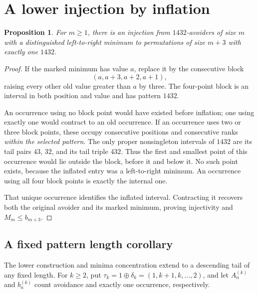 \documentclass[11pt]{article}
\newtheorem{proposition}[theorem]{Proposition}
\theoremstyle{remark}\newtheorem{remark}[theorem]{Remark}
\begin{document}
\section{A lower injection by inflation}\label{u1432:sec:lower}
\begin{proposition}\label{u1432:prop:lower}
For $m\ge1$, there is an injection from $1432$-avoiders of size $m$ with
a distinguished left-to-right minimum to permutations of size $m+3$
with exactly one $1432$.
\end{proposition}
\begin{proof}
If the marked minimum has value $a$, replace it by the consecutive block
\[
 (a,a+3,a+2,a+1),
\]
raising every other old value greater than $a$ by three. The four-point
block is an interval in both position and value and has pattern $1432$.

An occurrence using no block point would have existed before inflation;
one using exactly one would contract to an old occurrence. If an occurrence
uses two or three block points, these occupy consecutive positions and
consecutive ranks \emph{within the selected pattern}. The only proper
nonsingleton intervals of $1432$ are its tail pairs $43$, $32$, and its
tail triple $432$. Thus the first and smallest point of this occurrence
would lie outside the block, before it and below it. No such point exists,
because the inflated entry was a left-to-right minimum. An occurrence
using all four block points is exactly the internal one.

That unique occurrence identifies the inflated interval. Contracting it
recovers both the original avoider and its marked minimum, proving
injectivity and $M_m\le b_{m+3}$.
\end{proof}

\subsection{A fixed pattern length corollary}
The lower construction and minima concentration extend to a descending
tail of any fixed length. For $k\ge2$, put
$\tau_k=1\oplus\delta_k=(1,k+1,k,\ldots,2)$, and let $A_n^{(k)}$
and $b_n^{(k)}$ count avoidance and exactly one occurrence, respectively.
\end{document}
